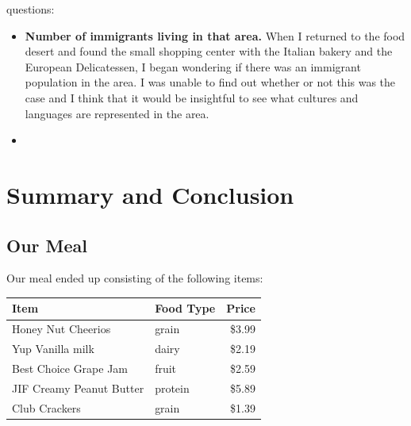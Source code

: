 \documentclass[11pt]{article}
\begin{document}
questions:

\begin{itemize}
    \item \textbf{Number of immigrants living in that area.} When I returned to the food desert and
        found the small shopping center with the Italian bakery and the European Delicatessen, I
        began wondering if there was an immigrant population in the area. I was unable to find out
        whether or not this was the case and I think that it would be insightful to see what
        cultures and languages are represented in the area.

    \item \textbf{}
\end{itemize}

\section{Summary and Conclusion}
\subsection{Our Meal}
Our meal ended up consisting of the following items: \\

\begin{tabular}{ l l r }
    Item & Food Type & Price \\
    \hline
    Honey Nut Cheerios & grain & \$3.99 \\
    Yup Vanilla milk & dairy & \$2.19 \\
    Best Choice Grape Jam & fruit & \$2.59 \\
    JIF Creamy Peanut Butter & protein & \$5.89 \\
    Club Crackers & grain & \$1.39 \\
\end{tabular}

\end{document}
